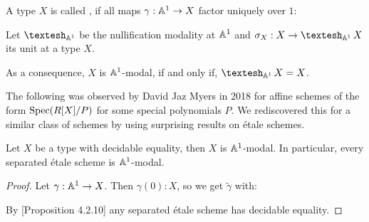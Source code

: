 \begin{definition}
  A type $X$ is called , if all maps $\gamma:\mathbb{A}^1\to X$ factor uniquely over $1$:
  \begin{center}
  \end{center}
\end{definition}

\begin{definition}
  Let $\shape_{\A^1}$ be the nullification modality at $\mathbb{A}^1$ and $\sigma_X:X\to \shape_{\A^1}X$ its unit at a type $X$. 
\end{definition}

As a consequence, $X$ is $\mathbb{A}^1$-modal, if and only if, $\shape_{\A^1}X=X$.

The following was observed by David Jaz Myers in 2018 for affine schemes of the form $\operatorname{Spec} (R[X]/P)$ for some special polynomials $P$.
We rediscovered this for a similar class of schemes by using surprising results on étale schemes.

\begin{proposition}
  Let $X$ be a type with decidable equality, then $X$ is $\mathbb{A}^1$-modal.
  In particular, every separated étale scheme is $\mathbb{A}^1$-modal.
\end{proposition}

\begin{proof}
  Let $\gamma:\mathbb{A}^1\to X$.
  Then $\gamma(0):X$, so we get $\tilde{\gamma}$ with:
  \begin{center}
  \end{center}
  By \cite{etale-draft}[Proposition 4.2.10] any separated étale scheme has decidable equality.
\end{proof}